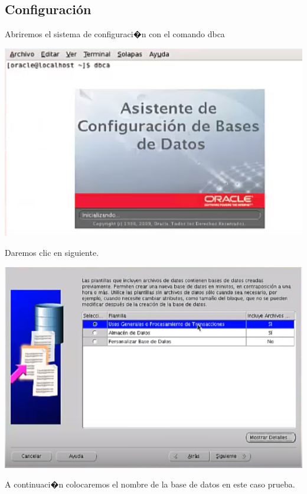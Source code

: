 \documentclass[12pt,letterpaper]{article}
\begin{document}
\subsection{Configuraci\'on}
Abriremos el sistema de configuraci�n con el comando dbca \\
\begin{center}
\includegraphics[width=15cm]{oraclelinux/30.png} 
\end{center}
Daremos clic en siguiente. \\
\begin{center}
\includegraphics[width=15cm]{oraclelinux/31.png}
\end{center}
A continuaci�n colocaremos el nombre de la base de datos en este caso  prueba. \\
\end{document}
